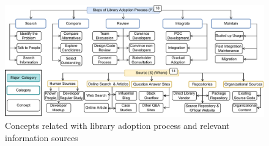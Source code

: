 



\label{sec:taxonomy}
\begin{figure}
    \centering
    \includegraphics[scale=0.85]{images/process.pdf}
    \caption{Concepts related with library adoption process and relevant information sources}
    \label{fig:process}
\end{figure}
